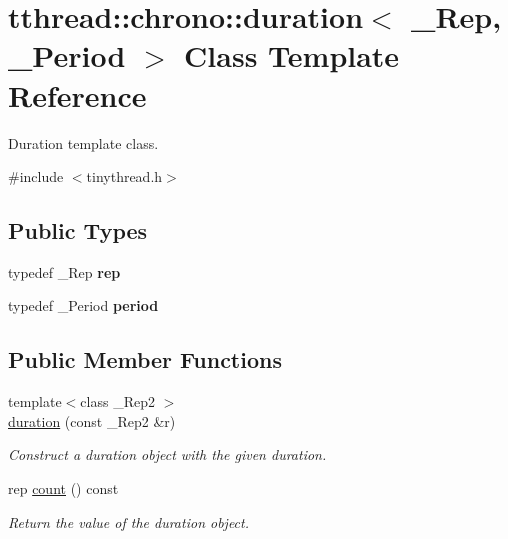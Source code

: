 \hypertarget{classtthread_1_1chrono_1_1duration}{}\section{tthread\+:\+:chrono\+:\+:duration$<$ \+\_\+\+Rep, \+\_\+\+Period $>$ Class Template Reference}
\label{classtthread_1_1chrono_1_1duration}


Duration template class.  




{\ttfamily \#include $<$tinythread.\+h$>$}

\subsection*{Public Types}
\begin{DoxyCompactItemize}
\item 
typedef \+\_\+\+Rep {\bfseries rep}\hypertarget{classtthread_1_1chrono_1_1duration_ab0eeedf8d65a71c8d425edd9125d5d5d}{}\label{classtthread_1_1chrono_1_1duration_ab0eeedf8d65a71c8d425edd9125d5d5d}

\item 
typedef \+\_\+\+Period {\bfseries period}\hypertarget{classtthread_1_1chrono_1_1duration_ab1d036bde4a83cf9cbff6f052aa4fa4c}{}\label{classtthread_1_1chrono_1_1duration_ab1d036bde4a83cf9cbff6f052aa4fa4c}

\end{DoxyCompactItemize}
\subsection*{Public Member Functions}
\begin{DoxyCompactItemize}
\item 
{\footnotesize template$<$class \+\_\+\+Rep2 $>$ }\\\hyperlink{classtthread_1_1chrono_1_1duration_ac770f1a718f28cd21508ffcd7b1080e3}{duration} (const \+\_\+\+Rep2 \&r)\hypertarget{classtthread_1_1chrono_1_1duration_ac770f1a718f28cd21508ffcd7b1080e3}{}\label{classtthread_1_1chrono_1_1duration_ac770f1a718f28cd21508ffcd7b1080e3}

\begin{DoxyCompactList}\small\item\em Construct a duration object with the given duration. \end{DoxyCompactList}\item 
rep \hyperlink{classtthread_1_1chrono_1_1duration_a97fd232e87112ae9d27ba0ce4fdc0c3e}{count} () const \hypertarget{classtthread_1_1chrono_1_1duration_a97fd232e87112ae9d27ba0ce4fdc0c3e}{}\label{classtthread_1_1chrono_1_1duration_a97fd232e87112ae9d27ba0ce4fdc0c3e}

\begin{DoxyCompactList}\small\item\em Return the value of the duration object. \end{DoxyCompactList}\end{DoxyCompactItemize}


